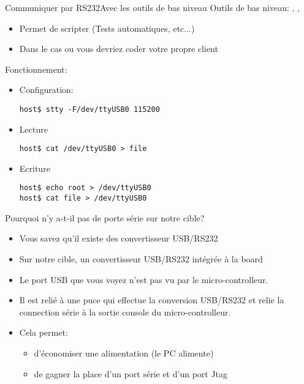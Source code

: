 \begin{frame}[fragile=singleslide]{Communiquer par RS232}{Avec les outils de bas niveau}
  Outils de bas niveau: , , 
  \begin{itemize}
  \item Permet de scripter (Tests automatiques, etc...)
  \item Dans le cas ou vous devriez coder votre propre client
  \end{itemize}
  Fonctionnement:
  \begin{itemize}
  \item Configuration:
\begin{lstlisting}
host$ stty -F/dev/ttyUSB0 115200
\end{lstlisting} %
  \item Lecture
\begin{lstlisting}
host$ cat /dev/ttyUSB0 > file
\end{lstlisting} %
  \item Ecriture
\begin{lstlisting}
host$ echo root > /dev/ttyUSB0
host$ cat file > /dev/ttyUSB0
\end{lstlisting} %
  \end{itemize}
\end{frame}

\begin{frame}{Pourquoi n'y a-t-il pas de porte série sur notre cible?}
  \begin{itemize}
  \item Vous savez qu'il existe des convertisseur USB/RS232
  \item  Sur notre  cible, un  convertisseur USB/RS232  intégrée  à la
    board
  \item   Le  port  USB   que  vous   voyez  n'est   pas  vu   par  le
    micro-controlleur.
  \item Il est  relié à une puce qui  effectue la conversion USB/RS232
    et   relie  la   connection   série  à   la   sortie  console   du
    micro-controlleur.
  \item Cela permet:
    \begin{itemize}
    \item d'économiser une alimentation (le PC alimente)
    \item  de  gagner la  place  d'un port  série  et  d'un port  Jtag
    \end{itemize}
  \end{itemize}
\end{frame}

